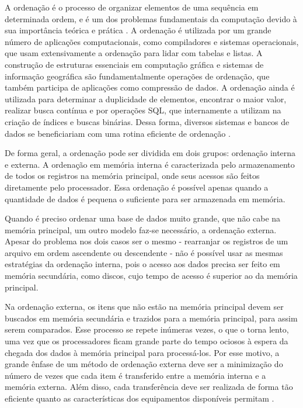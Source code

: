 A ordenação é o processo de organizar elementos de uma sequência em determinada ordem, e é um dos problemas fundamentais da computação devido à sua importância teórica e prática \cite{Knuth:1998, Cormen:2009}. 
A ordenação é utilizada por um grande número de aplicações computacionais, como compiladores e sistemas operacionais, que usam extensivamente a ordenação para lidar com tabelas e listas. 
A construção de estruturas essenciais em computação gráfica e sistemas de informação geográfica são fundamentalmente operações de ordenação, que também participa de aplicações como compressão de dados. A ordenação ainda é utilizada para determinar a duplicidade de elementos, encontrar o maior valor, realizar busca contínua e por operações SQL, que internamente a utilizam na criação de índices e buscas binárias. Dessa forma, diversos sistemas e bancos de dados se beneficiariam com uma rotina eficiente de ordenação \cite{Lauterbach:2009, Satish:2009 , Dean:2008}.




De forma geral, a ordenação pode ser dividida em dois grupos: ordenação interna e externa. 
A ordenação em memória interna é caracterizada pelo armazenamento de todos os registros na memória principal, onde seus acessos são feitos diretamente pelo processador. Essa ordenação é possível apenas quando a quantidade de dados é pequena o suficiente para ser armazenada em memória. 

Quando é preciso ordenar uma base de dados muito grande, que não cabe na memória principal, um outro modelo faz-se necessário, a ordenação externa.
Apesar do problema nos dois casos ser o mesmo - rearranjar os registros de um arquivo em ordem ascendente ou descendente - não é possível usar as mesmas estratégias da ordenação interna, pois o acesso aos dados precisa ser feito em memória secundária, como discos, cujo tempo de acesso é superior ao da memória principal.  %

Na ordenação externa, os itens que não estão na memória principal devem ser buscados em memória secundária e trazidos para a memória principal, para assim serem comparados. Esse processo se repete inúmeras vezes, o que o torna lento, uma vez que os processadores ficam grande parte do tempo ociosos à espera da chegada dos dados à memória principal para processá-los. Por esse motivo, a grande ênfase de um método de ordenação externa deve ser a minimização do número de vezes que cada item é transferido entre a memória interna e a memória externa. Além disso, cada transferência deve ser realizada de forma tão eficiente quanto as características dos equipamentos disponíveis permitam \cite{Ziviani:2007}.




